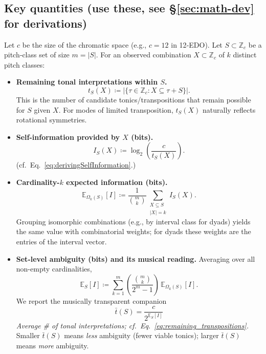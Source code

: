 \documentclass[10pt,twocolumn]{article}
\numberwithin{equation}{section} %
\begin{document}
    \subsection*{Key quantities (use these, see \S\ref{sec:math-dev} for derivations)}
    Let $c$ be the size of the chromatic space (e.g., $c{=}12$ in 12‑EDO).
    Let $S\subset \mathbb{Z}_c$ be a pitch‑class set of size $m{=}|S|$.
For an observed combination $X\subset \mathbb{Z}_c$ of $k$ distinct pitch classes:
    \begin{itemize}
        \item \textbf{Remaining tonal interpretations within $S$.}
        \begin{equation*}
            t_S(X) \coloneqq \bigl|\{\tau\in \mathbb{Z}_c : X \subseteq \tau{+}S\}\bigr|.
        \end{equation*}
        This is the number of candidate tonics/transpositions that remain possible for $S$ given $X$. For modes of limited transposition, $t_S(X)$ naturally reflects rotational symmetries.

        \item \textbf{Self-information provided by $X$ (bits).}
        \begin{equation*}
            I_S(X) \coloneqq \log_2\!\left(\frac{c}{t_S(X)}\right).
        \end{equation*}
        (cf.\ Eq.~\ref{eq:derivingSelfInformation}.)

        \item \textbf{Cardinality-$k$ expected information (bits).}
        \begin{equation*}
            \mathbb{E}_{\Omega_k(S)}[I]
            \coloneqq \frac{1}{\binom{m}{k}} \sum_{\substack{X\subseteq S\\ |X|=k}} I_S(X).
        \end{equation*}
        Grouping isomorphic combinations (e.g., by interval class for dyads) yields the same value with combinatorial weights; for dyads these weights are the entries of the interval vector.

        \item \textbf{Set-level ambiguity (bits) and its musical reading.}
        Averaging over all non-empty cardinalities,
        \begin{equation*}
            \mathbb{E}_S[I]
            \coloneqq \sum_{k=1}^{m}\!\left(\frac{\binom{m}{k}}{2^m-1}\right)\, \mathbb{E}_{\Omega_k(S)}[I].
        \end{equation*}
        We report the musically transparent companion
        \begin{equation*}
            \boxed{\bar{t}(S)=\frac{c}{2^{\mathbb{E}_S[I]}}}
        \end{equation*}
        \emph{Average \# of tonal interpretations; cf.\ Eq.~\ref{eq:remaining_transpositions}.}
        Smaller $\bar{t}(S)$ means \emph{less} ambiguity (fewer viable tonics); larger $\bar{t}(S)$ means \emph{more} ambiguity.
    \end{itemize}
\end{document}

